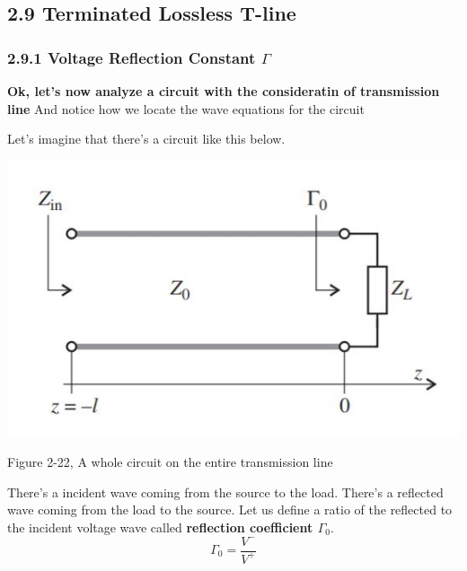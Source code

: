 \documentclass[11pt]{article}
\makeatletter
\newcommand{\boxspacing}{\kern\kvtcb@left@rule\kern\kvtcb@boxsep}
\newcommand{\prompt}[4]{
        \ttfamily\llap{{\color{#2}[#3]:\hspace{3pt}#4}}\vspace{-\baselineskip}
    }
\makeatother
\begin{document}
    \hypertarget{terminated-lossless-t-line}{%
\subsection{2.9 Terminated Lossless
T-line}\label{terminated-lossless-t-line}}

\hypertarget{voltage-reflection-constant-gamma}{%
\subsubsection{\texorpdfstring{2.9.1 Voltage Reflection Constant
\(\Gamma\)}{2.9.1 Voltage Reflection Constant \textbackslash{}Gamma}}\label{voltage-reflection-constant-gamma}}

    \textbf{Ok, let's now analyze a circuit with the consideratin of
transmission line} And notice how we locate the wave equations for the
circuit

    Let's imagine that there's a circuit like this below.

    \includegraphics{./image/chapter2/2-23.jpg}

Figure 2-22, A whole circuit on the entire transmission line

    There's a incident wave coming from the source to the load. There's a
reflected wave coming from the load to the source. Let us define a ratio
of the reflected to the incident voltage wave called \textbf{reflection
coefficient \(\Gamma_0\)}.\[\Gamma_0 = \frac{V^-}{V^+}\]

    \begin{tcolorbox}[breakable, size=fbox, boxrule=1pt, pad at break*=1mm,colback=cellbackground, colframe=cellborder]
\prompt{In}{incolor}{ }{\boxspacing}
\begin{Verbatim}[commandchars=\\\{\}]

\end{Verbatim}
\end{tcolorbox}


    
    
    
\end{document}
